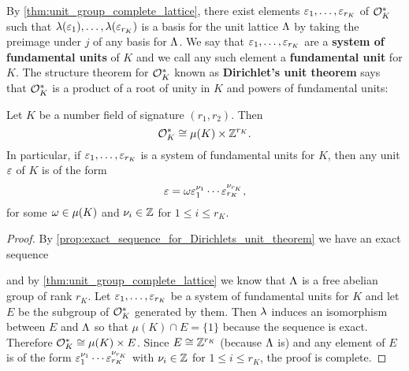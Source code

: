     By \cref{thm:unit_group_complete_lattice}, there exist elements $\varepsilon_{1},\ldots,\varepsilon_{r_{K}}$ of $\mathcal{O}_{K}^{\ast}$ such that $\lambda(\varepsilon_{1}),\ldots,\lambda(\varepsilon_{r_{K}})$ is a basis for the unit lattice $\Lambda$ by taking the preimage under $j$ of any basis for $\Lambda$. We say that $\varepsilon_{1},\ldots,\varepsilon_{r_{K}}$ are a \textbf{system of fundamental units} of $K$ and we call any such element a \textbf{fundamental unit} for $K$. The structure theorem for $\mathcal{O}_{K}^{\ast}$ known as \textbf{Dirichlet's unit theorem} says that $\mathcal{O}_{K}^{\ast}$ is a product of a root of unity in $K$ and powers of fundamental units:

    \begin{theorem*}
      Let $K$ be a number field of signature $(r_{1},r_{2})$. Then
      \[
        \mathcal{O}_{K}^{\ast} \cong \mu(K) \times \mathbb{Z}^{r_{K}}.
      \]
      In particular, if $\varepsilon_{1},\ldots,\varepsilon_{r_{K}}$ is a system of fundamental units for $K$, then any unit $\varepsilon$ of $K$ is of the form
      \[
        \varepsilon = \omega\varepsilon_{1}^{\nu_{1}} \cdots \varepsilon_{r_{K}}^{\nu_{r_{K}}},
      \]
      for some $\omega \in \mu(K)$ and $\nu_{i} \in \mathbb{Z}$ for $1 \le i \le r_{K}$.
    \end{theorem*}
    \begin{proof}
      By \cref{prop:exact_sequence_for_Dirichlets_unit_theorem} we have an exact sequence

      \begin{center}
      \end{center}

      and by \cref{thm:unit_group_complete_lattice} we know that $\Lambda$ is a free abelian group of rank $r_{K}$. Let $\varepsilon_{1},\ldots,\varepsilon_{r_{K}}$ be a system of fundamental units for $K$ and let $E$ be the subgroup of $\mathcal{O}_{K}^{\ast}$ generated by them. Then $\lambda$ induces an isomorphism between $E$ and $\Lambda$ so that $\mu(K) \cap E = \{1\}$ because the sequence is exact. Therefore $\mathcal{O}_{K}^{\ast} \cong \mu(K) \times E$. Since $E \cong \mathbb{Z}^{r_{K}}$ (because $\Lambda$ is) and any element of $E$ is of the form $\varepsilon_{1}^{\nu_{1}} \cdots \varepsilon_{r_{K}}^{\nu_{r_{K}}}$ with $\nu_{i} \in \mathbb{Z}$ for $1 \le i \le r_{K}$, the proof is complete.
    \end{proof}

